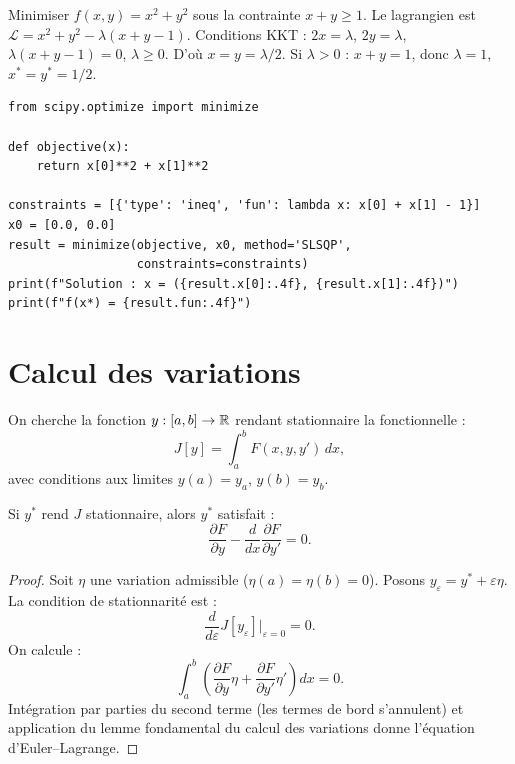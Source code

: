 \begin{exemple}
Minimiser $f(x,y)=x^2+y^2$ sous la contrainte $x+y\geq 1$.
Le lagrangien est $\mathcal{L}=x^2+y^2-\lambda(x+y-1)$.
Conditions KKT : $2x=\lambda$, $2y=\lambda$, $\lambda(x+y-1)=0$,
$\lambda\geq 0$.  D'o\`u $x=y=\lambda/2$.  Si $\lambda>0$ :
$x+y=1$, donc $\lambda=1$, $x^*=y^*=1/2$.
\end{exemple}

\begin{codeblock}[title=\textbf{Optimisation sous contraintes avec \texttt{scipy}}]
\begin{verbatim}
from scipy.optimize import minimize

def objective(x):
    return x[0]**2 + x[1]**2

constraints = [{'type': 'ineq', 'fun': lambda x: x[0] + x[1] - 1}]
x0 = [0.0, 0.0]
result = minimize(objective, x0, method='SLSQP',
                  constraints=constraints)
print(f"Solution : x = ({result.x[0]:.4f}, {result.x[1]:.4f})")
print(f"f(x*) = {result.fun:.4f}")
\end{verbatim}
\end{codeblock}

\section{Calcul des variations}
\label{sec:variations}

\begin{definition}
On cherche la fonction $y:[a,b]\to\mathbb{R}$ rendant stationnaire la
fonctionnelle :
\[
  J[y] = \int_a^b F(x,y,y')\,dx,
\]
avec conditions aux limites $y(a)=y_a$, $y(b)=y_b$.
\end{definition}

\begin{theoreme}
Si $y^*$ rend $J$ stationnaire, alors $y^*$ satisfait :
\[
  \frac{\partial F}{\partial y}
  - \frac{d}{dx}\frac{\partial F}{\partial y'} = 0.
\]
\end{theoreme}

\begin{proof}
Soit $\eta$ une variation admissible ($\eta(a)=\eta(b)=0$).  Posons
$y_\varepsilon = y^* + \varepsilon\eta$.  La condition de
stationnarit\'e est :
\[
  \frac{d}{d\varepsilon}J[y_\varepsilon]\bigg|_{\varepsilon=0} = 0.
\]
On calcule :
\[
  \int_a^b\left(\frac{\partial F}{\partial y}\eta
  + \frac{\partial F}{\partial y'}\eta'\right)dx = 0.
\]
Int\'egration par parties du second terme (les termes de bord
s'annulent) et application du lemme fondamental du calcul des
variations donne l'\'equation d'Euler--Lagrange.
\end{proof}

